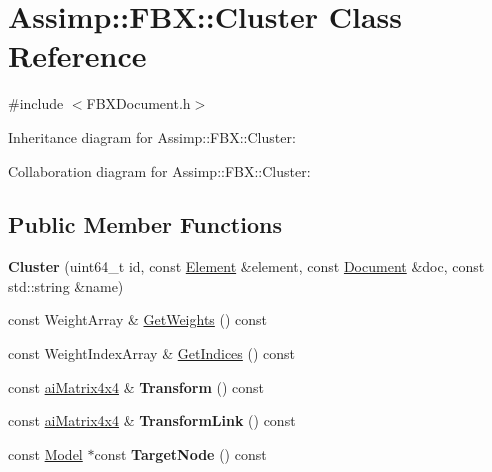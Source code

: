\hypertarget{class_assimp_1_1_f_b_x_1_1_cluster}{\section{Assimp\+:\+:F\+B\+X\+:\+:Cluster Class Reference}
\label{class_assimp_1_1_f_b_x_1_1_cluster}
}


{\ttfamily \#include $<$F\+B\+X\+Document.\+h$>$}



Inheritance diagram for Assimp\+:\+:F\+B\+X\+:\+:Cluster\+:


Collaboration diagram for Assimp\+:\+:F\+B\+X\+:\+:Cluster\+:
\subsection*{Public Member Functions}
\begin{DoxyCompactItemize}
\item 
\hypertarget{class_assimp_1_1_f_b_x_1_1_cluster_a9b405c9e68809a76186263acb098feab}{{\bfseries Cluster} (uint64\+\_\+t id, const \hyperlink{class_assimp_1_1_f_b_x_1_1_element}{Element} \&element, const \hyperlink{class_assimp_1_1_f_b_x_1_1_document}{Document} \&doc, const std\+::string \&name)}\label{class_assimp_1_1_f_b_x_1_1_cluster_a9b405c9e68809a76186263acb098feab}

\item 
const Weight\+Array \& \hyperlink{class_assimp_1_1_f_b_x_1_1_cluster_a379f435e63f603ff63ba93221567a9b4}{Get\+Weights} () const 
\item 
const Weight\+Index\+Array \& \hyperlink{class_assimp_1_1_f_b_x_1_1_cluster_a195b482a174b8336d0cf3e4c2f622c22}{Get\+Indices} () const 
\item 
\hypertarget{class_assimp_1_1_f_b_x_1_1_cluster_a4e1640076a093051f9a13a7586e37f78}{const \hyperlink{structai_matrix4x4}{ai\+Matrix4x4} \& {\bfseries Transform} () const }\label{class_assimp_1_1_f_b_x_1_1_cluster_a4e1640076a093051f9a13a7586e37f78}

\item 
\hypertarget{class_assimp_1_1_f_b_x_1_1_cluster_a9b5dc277af36076721dbc87c7048be44}{const \hyperlink{structai_matrix4x4}{ai\+Matrix4x4} \& {\bfseries Transform\+Link} () const }\label{class_assimp_1_1_f_b_x_1_1_cluster_a9b5dc277af36076721dbc87c7048be44}

\item 
\hypertarget{class_assimp_1_1_f_b_x_1_1_cluster_aa5fbaea988bcd166990f7ac76df20097}{const \hyperlink{class_assimp_1_1_f_b_x_1_1_model}{Model} $\ast$const {\bfseries Target\+Node} () const }\label{class_assimp_1_1_f_b_x_1_1_cluster_aa5fbaea988bcd166990f7ac76df20097}

\end{DoxyCompactItemize}
